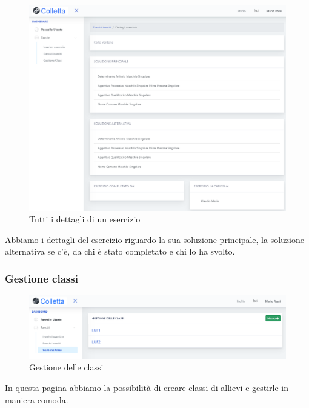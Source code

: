 \begin{figure}[H]
            	\centering
        		\includegraphics[width=17cm]{sez/img/insegnante/detagliesercizio.PNG} 
            	\caption{Tutti i dettagli di un esercizio}\label{fig:1}
        	\end{figure}     	
        	Abbiamo i dettagli del esercizio riguardo la sua soluzione principale, la soluzione alternativa se c'è, da chi è stato completato e chi lo ha svolto. 
        	
\newpage
        \subsubsection{Gestione classi}   
       
        \begin{figure}[H]
            	\centering
        		\includegraphics[width=17cm]{sez/img/insegnante/elencoclassi.PNG} 
            	\caption{Gestione delle classi}\label{fig:1}
        	\end{figure}          	
        	   
        In questa pagina abbiamo la possibilità di creare classi di allievi e gestirle  in maniera comoda. 

